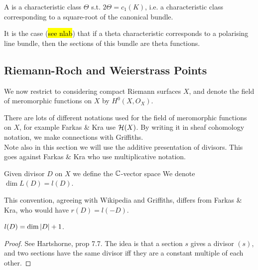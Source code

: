 \documentclass{article}
\begin{document}
\begin{definition}
	A  is a characteristic class $\Theta$ s.t. $2\Theta = c_1(K)$, i.e. a characteristic class corresponding to a square-root of the canonical bundle. 
\end{definition}

\begin{remark}
	It is the case (\hl{see nlab}) that if a theta characteristic corresponds to a polarising line bundle, then the sections of this bundle are theta functions. 
\end{remark}
\subsection{Riemann-Roch and Weierstrass Points}
We now restrict to considering compact Riemann surfaces $X$, and denote the field of meromorphic functions on $X$ by $H^0(X,O_X)$.
\begin{remark}
	There are lots of different notations used for the field of meromorphic functions on $X$, for example Farkas \& Kra use $\mathcal{H}(X)$. By writing it in sheaf cohomology notation, we make connections with Griffiths. \\
	Note also in this section we will use the additive presentation of divisors. This goes against Farkas \& Kra who use multiplicative notation.
\end{remark}

\begin{definition}\label{def: L(D) and l(D)}
	Given divisor $D$ on $X$ we define the $\mathbb{C}$-vector space 
	We denote $\dim L(D) = l(D)$.
\end{definition}

\begin{remark}
	This convention, agreeing with Wikipedia and Griffiths, differs from Farkas \& Kra, who would have $r(D) = l(-D)$. 
\end{remark}

\begin{lemma}
	$l(D) = \dim \left\lvert D \right\rvert+1$. 
\end{lemma}
\begin{proof}
	See Hartshorne, prop 7.7. The idea is that a section $s$ gives a divisor $(s)$, and two sections have the same divisor iff they are a constant multiple of each other. 
\end{proof}
\end{document}
